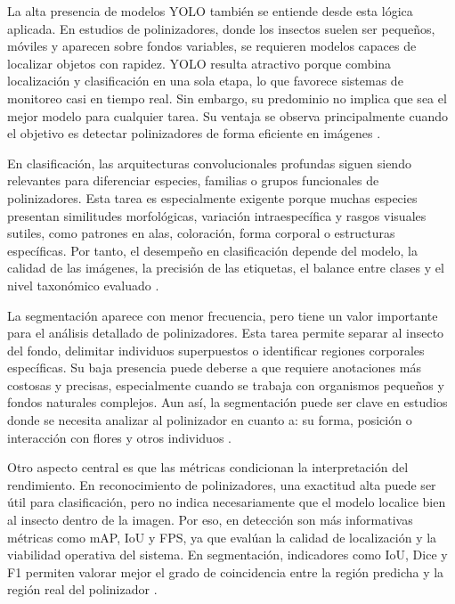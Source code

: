 La alta presencia de modelos YOLO también se entiende desde esta lógica aplicada. En estudios de polinizadores, donde los insectos suelen ser pequeños, móviles y aparecen sobre fondos variables, se requieren modelos capaces de localizar objetos con rapidez. YOLO resulta atractivo porque combina localización y clasificación en una sola etapa, lo que favorece sistemas de monitoreo casi en tiempo real. Sin embargo, su predominio no implica que sea el mejor modelo para cualquier tarea. Su ventaja se observa principalmente cuando el objetivo es detectar polinizadores de forma eficiente en imágenes \parencite{kulyukin2023accuracy, stark2023yolo, stefan2025successes, alex2025pollinator}.

En clasificación, las arquitecturas convolucionales profundas siguen siendo relevantes para diferenciar especies, familias o grupos funcionales de polinizadores. Esta tarea es especialmente exigente porque muchas especies presentan similitudes morfológicas, variación intraespecífica y rasgos visuales sutiles, como patrones en alas, coloración, forma corporal o estructuras específicas. Por tanto, el desempeño en clasificación depende del modelo, la calidad de las imágenes, la precisión de las etiquetas, el balance entre clases y el nivel taxonómico evaluado \parencite{spiesman2021bumblebee, spiesman2024identifying, calisan2025evaluation, srinivas2025south}.

La segmentación aparece con menor frecuencia, pero tiene un valor importante para el análisis detallado de polinizadores. Esta tarea permite separar al insecto del fondo, delimitar individuos superpuestos o identificar regiones corporales específicas. Su baja presencia puede deberse a que requiere anotaciones más costosas y precisas, especialmente cuando se trabaja con organismos pequeños y fondos naturales complejos. Aun así, la segmentación puede ser clave en estudios donde se necesita analizar al polinizador en cuanto a: su forma, posición o interacción con flores y otros individuos \parencite{nizam2020segmentation, rodrigues2022deepwings, kriouile2024nested, sledevic2025visual}.

Otro aspecto central es que las métricas condicionan la interpretación del rendimiento. En reconocimiento de polinizadores, una exactitud alta puede ser útil para clasificación, pero no indica necesariamente que el modelo localice bien al insecto dentro de la imagen. Por eso, en detección son más informativas métricas como mAP, IoU y FPS, ya que evalúan la calidad de localización y la viabilidad operativa del sistema. En segmentación, indicadores como IoU, Dice y F1 permiten valorar mejor el grado de coincidencia entre la región predicha y la región real del polinizador \parencite{varadarajan2021multiscale, saetchnikov2021uav, gupta2025cnn}.

